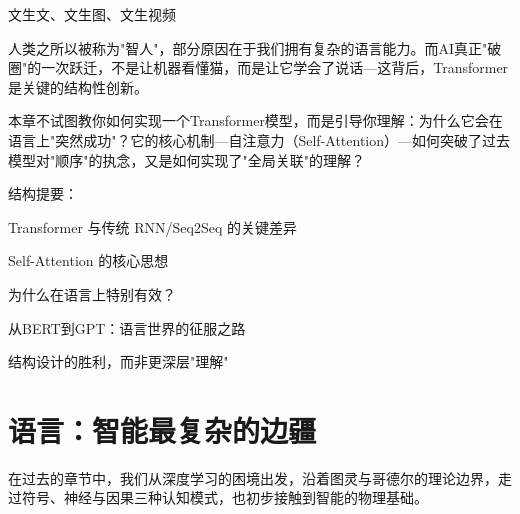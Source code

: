%
%
文生文、文生图、文生视频




人类之所以被称为"智人"，部分原因在于我们拥有复杂的语言能力。而AI真正"破圈"的一次跃迁，不是让机器看懂猫，而是让它学会了说话---这背后，Transformer 是关键的结构性创新。

本章不试图教你如何实现一个Transformer模型，而是引导你理解：为什么它会在语言上"突然成功"？它的核心机制---自注意力（Self-Attention）---如何突破了过去模型对"顺序"的执念，又是如何实现了"全局关联"的理解？

结构提要：

Transformer 与传统 RNN/Seq2Seq 的关键差异

Self-Attention 的核心思想

为什么在语言上特别有效？

从BERT到GPT：语言世界的征服之路

结构设计的胜利，而非更深层"理解"


\section*{语言：智能最复杂的边疆}

在过去的章节中，我们从深度学习的困境出发，沿着图灵与哥德尔的理论边界，走过符号、神经与因果三种认知模式，也初步接触到智能的物理基础。

